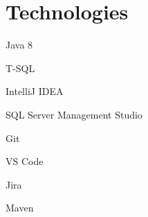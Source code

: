 \documentclass[letterpaper,11pt]{article}
\begin{document}
\section{Technologies}
\begin{description}[style=multiline,leftmargin=3cm]
	\item[Languages]
	      \begin{itemize*}
		      \item Java 8
		      \item T-SQL
	      \end{itemize*}
	\item[Software]
	      \begin{itemize*}
		      \item IntelliJ IDEA
		      \item SQL Server Management Studio
		      \item Git
		      \item VS Code
		      \item Jira
		      \item Maven
	      \end{itemize*}
\end{description}

\end{document}
